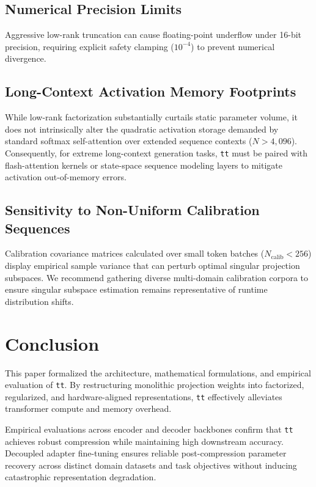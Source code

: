 \subsection{Numerical Precision Limits}
Aggressive low-rank truncation can cause floating-point underflow under 16-bit precision, requiring explicit safety clamping ($10^{-4}$) to prevent numerical divergence.

\subsection{Long-Context Activation Memory Footprints}
While low-rank factorization substantially curtails static parameter volume, it does not intrinsically alter the quadratic activation storage demanded by standard softmax self-attention over extended sequence contexts ($N > 4{,}096$). Consequently, for extreme long-context generation tasks, \texttt{tt} must be paired with flash-attention kernels or state-space sequence modeling layers to mitigate activation out-of-memory errors.

\subsection{Sensitivity to Non-Uniform Calibration Sequences}
Calibration covariance matrices calculated over small token batches ($N_{\text{calib}} < 256$) display empirical sample variance that can perturb optimal singular projection subspaces. We recommend gathering diverse multi-domain calibration corpora to ensure singular subspace estimation remains representative of runtime distribution shifts.


\section{Conclusion}
This paper formalized the architecture, mathematical formulations, and empirical evaluation of \texttt{tt}. By restructuring monolithic projection weights into factorized, regularized, and hardware-aligned representations, \texttt{tt} effectively alleviates transformer compute and memory overhead.

Empirical evaluations across encoder and decoder backbones confirm that \texttt{tt} achieves robust compression while maintaining high downstream accuracy. Decoupled adapter fine-tuning ensures reliable post-compression parameter recovery across distinct domain datasets and task objectives without inducing catastrophic representation degradation.

